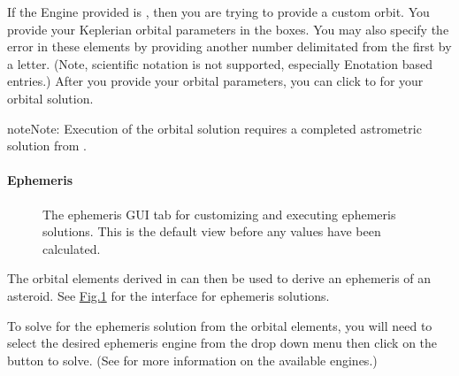 \documentclass[letterpaper,11pt,english]{sphinxmanual}
\begin{document}
\sphinxAtStartPar
If the Engine provided is , then you are trying to provide a
custom orbit. You provide your Keplerian orbital parameters in the boxes. You
may also specify the error in these elements by providing another number
delimitated from the first by a letter. (Note, scientific notation is not
supported, especially E\sphinxhyphen{}notation based entries.) After you provide your
orbital parameters, you can click  to  for your
orbital solution.

\begin{sphinxadmonition}{note}{Note:}
\sphinxAtStartPar
Execution of the orbital solution requires a completed astrometric
solution from
{\hyperref[\detokenize{user/manual_mode:user-manual-mode-procedure-find-asteroid-location-compute-astrometric-solution}]{}}.
\end{sphinxadmonition}


\paragraph{Ephemeris}
\label{\detokenize{user/manual_mode:ephemeris}}\label{\detokenize{user/manual_mode:user-manual-mode-procedure-ephemeris}}
\begin{figure}[H]
\centering
\capstart

\noindent{}
\caption{The ephemeris GUI tab for customizing and executing ephemeris solutions.
This is the default view before any values have been calculated.}\label{\detokenize{user/manual_mode:id9}}\label{\detokenize{user/manual_mode:figure-manual-mode-gui-ephemeris}}\end{figure}

\sphinxAtStartPar
The orbital elements derived in {\hyperref[\detokenize{user/manual_mode:user-manual-mode-procedure-orbital-elements}]{}}
can then be used to derive an ephemeris of an asteroid. See
\hyperref[\detokenize{user/manual_mode:figure-manual-mode-gui-ephemeris}]{Fig.\@ \ref{\detokenize{user/manual_mode:figure-manual-mode-gui-ephemeris}}} for the interface for ephemeris
solutions.

\sphinxAtStartPar
To solve for the ephemeris solution from the orbital elements, you will need to
select the desired ephemeris engine from the drop down menu then click on the
 button to solve.
(See {\hyperref[\detokenize{technical/architecture/services_engines:technical-architecture-services-engines}]{}} for more information on
the available engines.)
\end{document}

